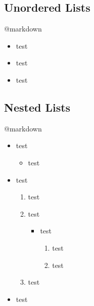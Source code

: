 \subsection{Unordered Lists}
\label{unorderedlists}

@markdown

\begin{itemize}
\item test

\item test

\item test

\end{itemize}

\subsection{Nested Lists}
\label{nestedlists}

@markdown

\begin{itemize}
\item test

\begin{itemize}
\item test

\end{itemize}

\item test

\begin{enumerate}
\item test

\item test

\begin{itemize}
\item test

\begin{enumerate}
\item test

\item test

\end{enumerate}

\end{itemize}

\item test

\end{enumerate}

\item test

\end{itemize}

